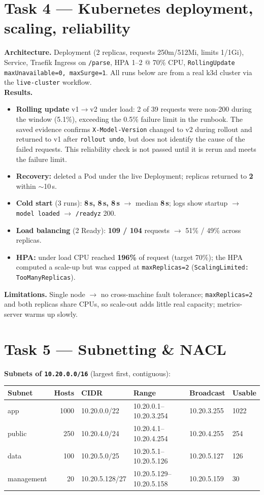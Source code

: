 \documentclass[10pt,a4paper]{article}
\newcommand{\code}[1]{\texttt{\small #1}}
\begin{document}
\section{Task 4 --- Kubernetes deployment, scaling, reliability}
\textbf{Architecture.} Deployment (2 replicas, requests 250m/512Mi, limits 1/1Gi), Service, Traefik Ingress
on \code{/parse}, HPA 1--2 @ 70\% CPU, \code{RollingUpdate maxUnavailable=0, maxSurge=1}. All runs below are
from a real k3d cluster via the \code{live-cluster} workflow.\\
\textbf{Results.}
\begin{itemize}
\item \textbf{Rolling update} v1$\rightarrow$v2 under load: 2 of 39 requests were non-200 during the
window (5.1\%), exceeding the 0.5\% failure limit in the runbook. The saved evidence confirms
\code{X-Model-Version} changed to v2 during rollout and returned to v1 after \code{rollout undo}, but
does not identify the cause of the failed requests. This reliability check is not passed until it is
rerun and meets the failure limit.
\item \textbf{Recovery:} deleted a Pod under the live Deployment; replicas returned to \textbf{2} within
$\sim$10\,s.
\item \textbf{Cold start} (3 runs): \textbf{8\,s, 8\,s, 8\,s} $\rightarrow$ median \textbf{8\,s}; logs show
startup $\rightarrow$ \code{model loaded} $\rightarrow$ \code{/readyz} 200.
\item \textbf{Load balancing} (2 Ready): \textbf{109 / 104} requests $\rightarrow$ 51\% / 49\% across replicas.
\item \textbf{HPA:} under load CPU reached \textbf{196\%} of request (target 70\%); the HPA computed a
scale-up but was capped at \code{maxReplicas=2} (\code{ScalingLimited: TooManyReplicas}).
\end{itemize}
\textbf{Limitations.} Single node $\rightarrow$ no cross-machine fault tolerance; \code{maxReplicas=2} and
both replicas share CPUs, so scale-out adds little real capacity; metrics-server warms up slowly.

\section{Task 5 --- Subnetting \& NACL}
\textbf{Subnets of \code{10.20.0.0/16}} (largest first, contiguous):

\begin{center}\small
\begin{tabular}{lrllll}
\toprule
Subnet & Hosts & CIDR & Range & Broadcast & Usable \\
\midrule
app & 1000 & 10.20.0.0/22 & 10.20.0.1--10.20.3.254 & 10.20.3.255 & 1022 \\
public & 250 & 10.20.4.0/24 & 10.20.4.1--10.20.4.254 & 10.20.4.255 & 254 \\
data & 100 & 10.20.5.0/25 & 10.20.5.1--10.20.5.126 & 10.20.5.127 & 126 \\
management & 20 & 10.20.5.128/27 & 10.20.5.129--10.20.5.158 & 10.20.5.159 & 30 \\
\bottomrule
\end{tabular}
\end{center}
\end{document}
